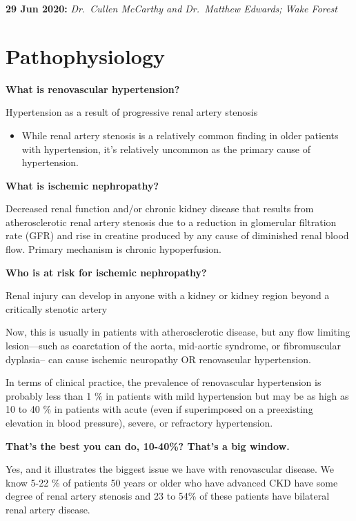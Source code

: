\documentclass[
]{book}
\providecommand{\tightlist}{%
  \setlength{\itemsep}{0pt}\setlength{\parskip}{0pt}}
\begin{document}
\textbf{29 Jun 2020:} \emph{Dr.~Cullen McCarthy and Dr.~Matthew Edwards; Wake
Forest}

\hypertarget{pathophysiology-1}{%
\section{Pathophysiology}\label{pathophysiology-1}}

\textbf{What is renovascular hypertension?}

Hypertension as a result of progressive renal artery stenosis

\begin{itemize}
\tightlist
\item
  While renal artery stenosis is a relatively common finding in older
  patients with hypertension, it's relatively uncommon as the primary
  cause of hypertension.
\end{itemize}

\textbf{What is ischemic nephropathy?}

Decreased renal function and/or chronic kidney disease that results from
atherosclerotic renal artery stenosis due to a reduction in glomerular
filtration rate (GFR) and rise in creatine produced by any cause of
diminished renal blood flow. Primary mechanism is chronic hypoperfusion.
\citep{rickey125RenovascularDisease2019}

\textbf{Who is at risk for ischemic nephropathy?}

Renal injury can develop in anyone with a kidney or kidney region beyond
a critically stenotic artery

Now, this is usually in patients with atherosclerotic disease, but any
flow limiting lesion---such as coarctation of the aorta, mid-aortic
syndrome, or fibromuscular dyplasia-- can cause ischemic neuropathy OR
renovascular hypertension.

In terms of clinical practice, the prevalence of renovascular
hypertension is probably less than 1 \% in patients with mild
hypertension but may be as high as 10 to 40 \% in patients with acute
(even if superimposed on a preexisting elevation in blood pressure),
severe, or refractory hypertension.

\textbf{That's the best you can do, 10-40\%? That's a big window.}

Yes, and it illustrates the biggest issue we have with renovascular
disease. We know 5-22 \% of patients 50 years or older who have advanced
CKD have some degree of renal artery stenosis and 23 to 54\% of these
patients have bilateral renal artery disease.
\end{document}
